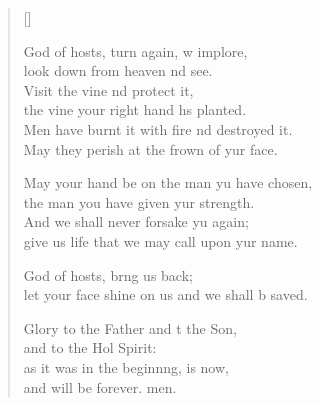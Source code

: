 \begin{verse}[\versewidth]
\begin{patverse}
God of hosts, turn again, w implore,\Med\\
look down from heaven nd see.\\
Visit the vine nd protect it,\Med\\
the vine your right hand hs planted.\\
Men have burnt it with fire nd destroyed it.\Med\\
May they perish at the frown of yur face.

May your hand be on the man yu have chosen,\Med\\
the man you have given yur strength.\\
And we shall never forsake yu again;\Med\\
give us life that we may call upon yur name.

God of hosts, br\pointup{\i}ng us back;\Med\\
let your face shine on us and we shall b saved.

Glory to the Father and t the Son,\Med\\
and to the Hol Spirit:\\
as it was in the beginn\pointup{\i}ng, is now,\Med\\
and will be forever. men.
  \end{patverse}
\end{verse}
